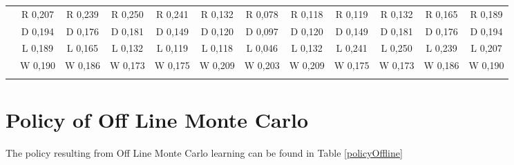 \documentclass{article}
\begin{document}
\begin{table}[htbp]
\begin{footnotesize}
\begin{tabular}{c|c|c|c|c|c|c|c|c|c|c|c|}
&R 0,207&R 0,239&R 0,250&R 0,241&R 0,132&R 0,078&R 0,118&R 0,119&R 0,132&R 0,165&R 0,189\\
&D 0,194&D 0,176&D 0,181&D 0,149&D 0,120&D 0,097&D 0,120&D 0,149&D 0,181&D 0,176&D 0,194\\
&L 0,189&L 0,165&L 0,132&L 0,119&L 0,118&L 0,046&L 0,132&L 0,241&L 0,250&L 0,239&L 0,207\\
&W 0,190&W 0,186&W 0,173&W 0,175&W 0,209&W 0,203&W 0,209&W 0,175&W 0,173&W 0,186&W 0,190\\
\hline \\
\end{tabular}
\end{footnotesize}
\end{table}
\section{Policy of Off Line Monte Carlo} \label{policyOffLineMonteCarlo}
The policy resulting from Off Line Monte Carlo learning can be found in Table \ref{policyOffline}
\end{document}

